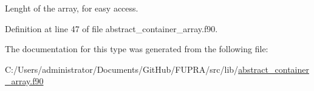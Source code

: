 Lenght of the array, for easy access. 



Definition at line 47 of file abstract\+\_\+container\+\_\+array.\+f90.



The documentation for this type was generated from the following file\+:\begin{DoxyCompactItemize}
\item 
C\+:/\+Users/administrator/\+Documents/\+Git\+Hub/\+F\+U\+P\+R\+A/src/lib/\mbox{\hyperlink{abstract__container__array_8f90}{abstract\+\_\+container\+\_\+array.\+f90}}\end{DoxyCompactItemize}
